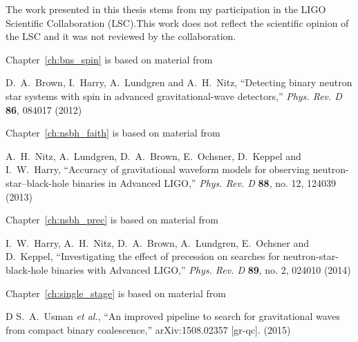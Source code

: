 
The work presented in this thesis stems from my participation in the
LIGO Scientific Collaboration (LSC).This work does not reflect the
scientific opinion of the LSC and it was not
reviewed by the collaboration.

\vspace*{0.5cm}

\noindent Chapter~\ref{ch:bns_spin} is based on material from

\vspace*{0.25cm}

\noindent   D.~A.~Brown, I.~Harry, A.~Lundgren and A.~H.~Nitz,
``Detecting binary neutron star systems with spin in advanced gravitational-wave detectors,''
{\it Phys. Rev. D} {\bf 86}, 084017 (2012)

\vspace*{0.5cm}

\noindent Chapter~\ref{ch:nsbh_faith} is based on material from

\vspace*{0.25cm}

\noindent    A.~H.~Nitz, A.~Lundgren, D.~A.~Brown, E.~Ochsner, D.~Keppel and I.~W.~Harry,
``Accuracy of gravitational waveform models for observing neutron-star–black-hole binaries in Advanced LIGO,''
{\it Phys. Rev. D} {\bf 88}, no. 12, 124039 (2013)
\vspace*{0.5cm}

\noindent Chapter~\ref{ch:nsbh_prec} is based on material from

\vspace*{0.25cm}

\noindent   I.~W.~Harry, A.~H.~Nitz, D.~A.~Brown, A.~Lundgren, E.~Ochsner and D.~Keppel,
``Investigating the effect of precession on searches for neutron-star-black-hole binaries with Advanced LIGO,''
{\it Phys. Rev. D} {\bf 89}, no. 2, 024010 (2014)

\vspace*{0.5cm}

\noindent Chapter~\ref{ch:single_stage} is based on material from

\vspace*{0.25cm}

\noindent D  S.~A.~Usman {\it et al.}, ``An improved pipeline to search for gravitational waves from compact binary coalescence,''
 arXiv:1508.02357 [gr-qc]. (2015)

\vspace*{0.5cm}


